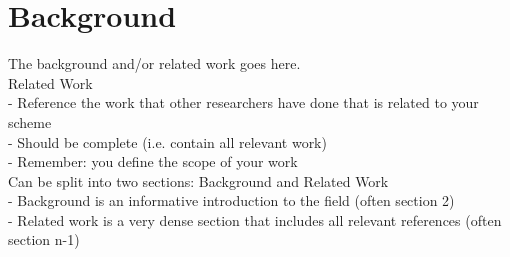 \section{Background}
The background and/or related work goes here.
\\
Related Work\\
- Reference the work that other researchers have done 
that is related to your scheme\\
- Should be complete (i.e. contain all relevant work)\\
- Remember: you define the scope of your work\\
Can be split into two sections: Background and Related 
Work\\
- Background is an informative introduction to the field (often section 2)\\
- Related work is a very dense section that includes all relevant 
references (often section n-1)\\